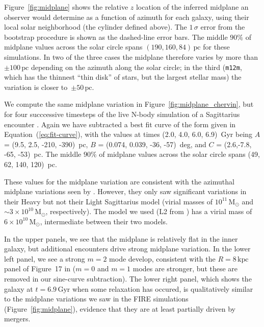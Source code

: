 \documentclass[twocolumn]{aastex62}
\newcommand{\Msun}{\ensuremath{\text{M}_\odot}}
\newcommand{\pc}{\text{pc}}
\newcommand{\kpc}{\text{kpc}}
\newcommand{\Gyr}{\text{Gyr}}
\newcommand{\mm}{\texttt{m12m}}
\begin{document}
Figure~\ref{fig:midplane} shows the relative $z$ location of the inferred
midplane an observer would determine as a function of azimuth for each galaxy,
using their local solar neighborhood (the cylinder defined above). The
$1\,\sigma$ error from the bootstrap procedure is shown as the dashed-line
error bars. The middle $90\%$ of midplane values across the solar circle spans
$(190, 160, 84)\,\pc$ for these simulations. In two of the three cases the
midplane therefore varies by more than $\pm 100\,\pc$ depending on the azimuth
along the solar circle; in the third (\mm{}, which has the thinnest ``thin
disk'' of stars, but the largest stellar mass) the variation is closer to~$\pm
50\,\pc$.

We compute the same midplane variation in Figure~\ref{fig:midplane_chervin},
but for four succcessive timesteps of the live N-body simulation of a
Sagittarius encounter \citep{2018MNRAS.481..286L}. Again we have subtracted a
best fit curve of the form given in Equation~(\ref{eq:fit-curve}), with the
values at times
    (2.0, 4.0, 6.0, 6.9)~Gyr being $A$ = (9.5, 2.5, -210, -390)~pc,
    $B$ = (0.074, 0.039, -36, -57)~deg, and $C$ = (2.6,-7.8, -65,
    -53)~pc. The middle $90\%$ of midplane values across the solar
    circle spans (49, 62, 140, 120)~pc. 

These values for the midplane variation are consistent with the azimuthal
midplane variations seen by \citet{2013MNRAS.429..159G}. However, they only
saw significant variations in their Heavy but not their Light Sagittarius
model (virial masses of $10^{11}\,\Msun$ and $\sim3\times10^{10}\,\Msun$,
respectively). The model we used (L2 from \citet{2018MNRAS.481..286L}) has a
virial mass of $6\times10^{10}\,\Msun$, intermediate between their two models.

In the upper panels, we see that the midplane is relatively flat in the inner
galaxy, but additional encounters drive strong midplane variation. In the
lower left panel, we see a strong $m=2$ mode develop, consistent with the
$R=8\,\kpc$ panel of Figure~17 in \citet{2018MNRAS.481..286L} ($m=0$ and $m=1$
modes are stronger, but these are removed in our sine-curve subtraction). The
lower right panel, which shows the galaxy at $t=6.9\,\Gyr$ when some
relaxation has occured, is qualitatively similar to the midplane variations we
saw in the FIRE simulations (Figure~\ref{fig:midplane}), evidence that they
are at least partially driven by mergers.
\end{document}
